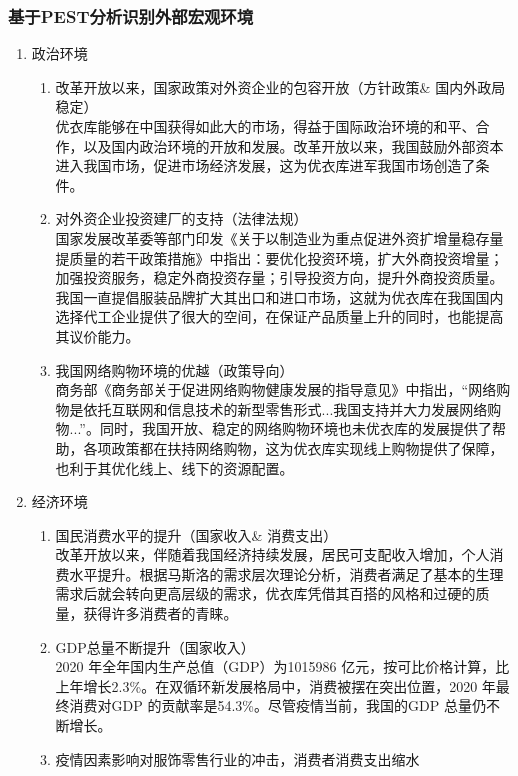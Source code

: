 \documentclass{xjtureport}
\begin{document}
\subsubsection{基于PEST分析识别外部宏观环境}
\begin{enumerate}
    \item 政治环境
    \begin{enumerate}
        \item 改革开放以来，国家政策对外资企业的包容开放（方针政策\& 国内外政局稳定）\\
        优衣库能够在中国获得如此大的市场，得益于国际政治环境的和平、合作，以及国内政治环境的开放和发展。改革开放以来，我国鼓励外部资本进入我国市场，促进市场经济发展，这为优衣库进军我国市场创造了条件。
        \item 对外资企业投资建厂的支持（法律法规）\\
        国家发展改革委等部门印发《关于以制造业为重点促进外资扩增量稳存量提质量的若干政策措施》中指出：要优化投资环境，扩大外商投资增量；加强投资服务，稳定外商投资存量；引导投资方向，提升外商投资质量。\cite{ref3}我国一直提倡服装品牌扩大其出口和进口市场，这就为优衣库在我国国内选择代工企业提供了很大的空间，在保证产品质量上升的同时，也能提高其议价能力。
        \item 我国网络购物环境的优越（政策导向）\\
        商务部《商务部关于促进网络购物健康发展的指导意见》中指出，“网络购物是依托互联网和信息技术的新型零售形式...我国支持并大力发展网络购物...”\cite{ref4}。同时，我国开放、稳定的网络购物环境也未优衣库的发展提供了帮助，各项政策都在扶持网络购物，这为优衣库实现线上购物提供了保障，也利于其优化线上、线下的资源配置。
    \end{enumerate}
    \item 经济环境
    \begin{enumerate}
        \item 国民消费水平的提升（国家收入\& 消费支出）\\
        改革开放以来，伴随着我国经济持续发展，居民可支配收入增加，个人消费水平提升。根据马斯洛的需求层次理论分析，消费者满足了基本的生理需求后就会转向更高层级的需求，优衣库凭借其百搭的风格和过硬的质量，获得许多消费者的青睐。
        \item GDP总量不断提升（国家收入）\\
        2020 年全年国内生产总值（GDP）为1015986 亿元，按可比价格计算，比上年增长2.3\%。在双循环新发展格局中，消费被摆在突出位置，2020 年最终消费对GDP 的贡献率是54.3\%。尽管疫情当前，我国的GDP 总量仍不断增长。
        \item 疫情因素影响对服饰零售行业的冲击，消费者消费支出缩水\\

\end{enumerate}
\end{enumerate}
\end{document}
